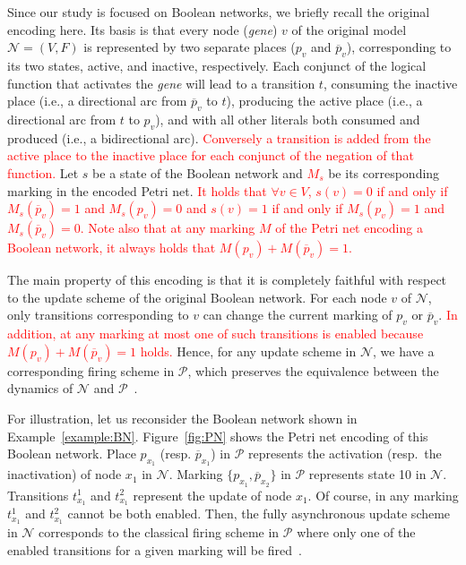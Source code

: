 \documentclass[preprint,12pt]{elsarticle}
\newcommand{\change}[1]{\textcolor{red}{#1}}
\begin{document}
Since our study is focused on Boolean networks, we briefly recall the original encoding here.
Its basis is that every node (\emph{gene}) \(v\) of the original model \(\mathcal{N} = (V, F)\) is represented by two separate places (\(p_v\) and \(\overline{p}_v\)), corresponding to its two states, active, and inactive, respectively.
Each conjunct of the logical function that activates the \emph{gene} will lead to a transition \(t\), consuming the inactive place (i.e., a directional arc from \(\overline{p}_v\) to \(t\)), producing the active place (i.e., a directional arc from \(t\) to \(p_v\)), and with all other literals both consumed and produced (i.e., a bidirectional arc).
\change{Conversely a transition is added from the active place to the inactive place for each conjunct of the negation of that function.}
Let \(s\) be a state of the Boolean network and \change{\(M_s\)} be its corresponding marking in the encoded Petri net.
\change{It holds that \(\forall v \in V\), \(s(v) = 0\) if and only if \(M_s(\overline{p}_v) = 1\) \change{and \(M_s(p_v) = 0\)} and \(s(v) = 1\) if and only if \(M_s(p_v) = 1\) \change{and \(M_s(\overline{p}_v) = 0\)}. Note also that at any marking \(M\) of the Petri net encoding a Boolean network, it always holds that \(M(p_v) + M(\overline{p}_v) = 1\).}

The main property of this encoding is that it is completely faithful with respect to the update scheme of the original Boolean network.
For each node \(v\) of \(\mathcal{N}\), only transitions corresponding to \(v\) can change the current marking of \(p_v\) or \(\overline{p}_v\).
\change{In addition, at any marking at most one of such transitions is enabled because \(M(p_v) + M(\overline{p}_v) = 1\) holds.}
Hence, for any update scheme in \(\mathcal{N}\), we have a corresponding firing scheme in \(\mathcal{P}\), which preserves the equivalence between the dynamics of \(\mathcal{N}\) and \(\mathcal{P}\)~\cite{DBLP:journals/nc/ChatainHKPT20}.

For illustration, let us reconsider the Boolean network shown in Example~\ref{example:BN}.
Figure~\ref{fig:PN} shows the Petri net encoding of this Boolean network.
Place \(p_{x_1}\) (resp. \(\overline{p}_{x_1}\)) in \(\mathcal{P}\) represents the activation (resp.\ the inactivation) of node \(x_1\) in \(\mathcal{N}\).
Marking \(\{p_{x_1}, \overline{p}_{x_2}\}\) in \(\mathcal{P}\) represents state 10 in \(\mathcal{N}\).
Transitions \(t^{1}_{x_1}\) and \(t^{2}_{x_1}\) represent the update of node \(x_1\).
Of course, in any marking \(t^{1}_{x_1}\) and \(t^{2}_{x_1}\) cannot be both enabled.
Then, the fully asynchronous update scheme in \(\mathcal{N}\) corresponds to the classical firing scheme in \(\mathcal{P}\) where only one of the enabled transitions for a given marking will be fired~\cite{Murata1989}.
\end{document}

